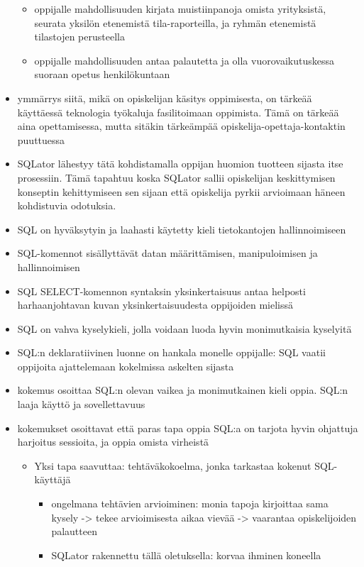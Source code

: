 \documentclass[finnish,twoside,openright]{HYgraduMLDS}
\begin{document}
\begin{itemize}
\begin{itemize}
        \item oppijalle mahdollisuuden kirjata muistiinpanoja omista yrityksistä, seurata yksilön etenemistä tila-raporteilla, ja ryhmän etenemistä tilastojen perusteella
        \item oppijalle mahdollisuuden antaa palautetta ja olla vuorovaikutuskessa suoraan opetus henkilökuntaan
    \end{itemize}
    \item ymmärrys siitä, mikä on opiskelijan käsitys oppimisesta, on tärkeää käyttäessä teknologia työkaluja fasilitoimaan oppimista. Tämä on tärkeää aina opettamisessa, mutta sitäkin tärkeämpää opiskelija-opettaja-kontaktin puuttuessa
    \item SQLator lähestyy tätä kohdistamalla oppijan huomion tuotteen sijasta itse prosessiin. Tämä tapahtuu koska SQLator sallii opiskelijan keskittymisen konseptin kehittymiseen sen sijaan että opiskelija pyrkii arvioimaan häneen kohdistuvia odotuksia.
    \item SQL on hyväksytyin ja laahasti käytetty kieli tietokantojen hallinnoimiseen
    \item SQL-komennot sisällyttävät datan määrittämisen, manipuloimisen ja hallinnoimisen
    \item SQL SELECT-komennon syntaksin yksinkertaisuus antaa helposti harhaanjohtavan kuvan yksinkertaisuudesta oppijoiden mielissä
    \item SQL on vahva kyselykieli, jolla voidaan luoda hyvin monimutkaisia kyselyitä
    \item SQL:n deklaratiivinen luonne on hankala monelle oppijalle: SQL vaatii oppijoita ajattelemaan kokelmissa askelten sijasta
    \item kokemus osoittaa SQL:n olevan vaikea ja monimutkainen kieli oppia. SQL:n laaja käyttö ja sovellettavuus 
    \item kokemukset osoittavat että paras tapa oppia SQL:a on tarjota hyvin ohjattuja harjoitus sessioita, ja oppia omista virheistä
    \begin{itemize}
        \item Yksi tapa saavuttaa: tehtäväkokoelma, jonka tarkastaa kokenut SQL-käyttäjä
        \begin{itemize}
            \item ongelmana tehtävien arvioiminen: monia tapoja kirjoittaa sama kysely -> tekee arvioimisesta aikaa vievää -> vaarantaa opiskelijoiden palautteen
            \item SQLator rakennettu tällä oletuksella: korvaa ihminen koneella
        \end{itemize}
    \end{itemize}
    

\end{itemize}
\end{document}
